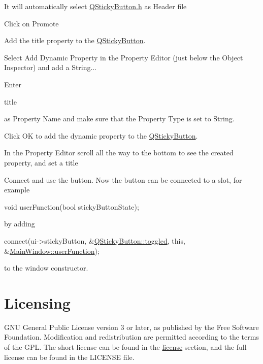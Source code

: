 \begin{DoxyEnumerate}
\begin{DoxyItemize}
\item It will automatically select {\ttfamily \hyperlink{_q_sticky_button_8h}{Q\-Sticky\-Button.\-h}} as {\ttfamily Header file}
\item Click on {\ttfamily Promote}
\end{DoxyItemize}
\item Add the title property to the \hyperlink{class_q_sticky_button}{Q\-Sticky\-Button}.
\begin{DoxyItemize}
\item Select {\ttfamily Add Dynamic Property} in the {\ttfamily Property Editor} (just below the {\ttfamily Object Inspector}) and add a {\ttfamily String...}
\item Enter\begin{DoxyVerb}title \end{DoxyVerb}
 as {\ttfamily Property Name} and make sure that the {\ttfamily Property Type} is set to {\ttfamily String}.
\item Click {\ttfamily O\-K} to add the dynamic property to the \hyperlink{class_q_sticky_button}{Q\-Sticky\-Button}.
\item In the {\ttfamily Property Editor} scroll all the way to the bottom to see the created property, and set a title
\end{DoxyItemize}
\item Connect and use the button. Now the button can be connected to a {\ttfamily slot}, for example
\begin{DoxyCode}
\textcolor{keywordtype}{void} userFunction(\textcolor{keywordtype}{bool} stickyButtonState); 
\end{DoxyCode}
 by adding
\begin{DoxyCode}
connect(ui->stickyButton, &\hyperlink{class_q_sticky_button_ab47e7e8f739b82d34cceb4f5f2ccb101}{QStickyButton::toggled},
        \textcolor{keyword}{this}, &\hyperlink{class_main_window_a648ea2bfab3eef2287c28a76a8e86948}{MainWindow::userFunction}); 
\end{DoxyCode}
 to the window constructor.
\end{DoxyEnumerate}\hypertarget{index_licensing}{}\section{Licensing}\label{index_licensing}
G\-N\-U General Public License version 3 or later, as published by the Free Software Foundation. Modification and redistribution are permitted according to the terms of the G\-P\-L. The short license can be found in the \hyperlink{license}{license} section, and the full license can be found in the {\ttfamily L\-I\-C\-E\-N\-S\-E} file. 